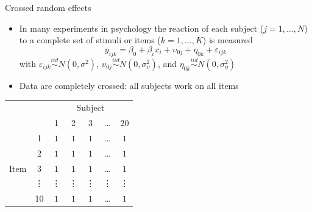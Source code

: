 \documentclass[aspectratio=169]{beamer}
\begin{document}
\begin{frame}{Crossed random effects}
  \begin{itemize}
    \item In many experiments in psychology the reaction of each subject ($j =
      1, \dots, N$) to a complete set of stimuli or items ($k = 1, \dots, K$) is
      measured
  \[
    y_{ijk} = \beta_0 + \beta_ix_{i} + \upsilon_{0j} + \eta_{0k} + \varepsilon_{ijk}
  \]
  with $\varepsilon_{ijk} \overset{iid}{\sim} N(0,\sigma^2)$, 
  $\upsilon_{0j} \overset{iid}{\sim} N(0,\sigma^2_{\upsilon})$, and 
  $\eta_{0k} \overset{iid}{\sim} N(0,\sigma^2_{\eta})$

    \item Data are completely crossed: all subjects work on all items
  \end{itemize}
  \footnotesize
  \begin{center}
  \begin{tabular}{lcccccc}
    & & \multicolumn{5}{c}{Subject}\\
    \cline{3-7}
     & & 1 & 2 & 3 & \dots & 20 \\
    \hline
      & 1 & $1$ & $1$ & $1$ & \dots & $1$ \\
      & 2 & $1$ & $1$ & $1$ & \dots & $1$ \\
Item  & 3 & $1$ & $1$ & $1$ & \dots & $1$ \\
      & \vdots & \vdots & \vdots & \vdots & \vdots & \vdots\\
      & 10 & $1$ & $1$ & $1$ & \dots & $1$ \\
      \hline
  \end{tabular}
  \end{center}
\end{frame}
\end{document}
